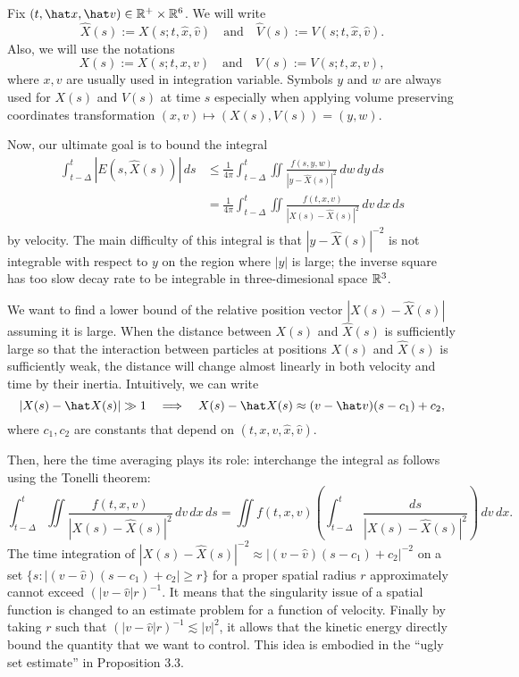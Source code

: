 \documentclass{article}
\begin{document}
\begin{notn*}
Fix $(t,\hat x,\hat v)\in\R^+\times\R^6$.
We will write
\[\hat X(s):=X(s;t,\hat x,\hat v)\quad\text{and}\quad\hat V(s):=V(s;t,\hat x,\hat v).\]
Also, we will use the notations
\[X(s):=X(s;t,x,v)\quad\text{and}\quad V(s):=V(s;t,x,v),\]
where $x,v$ are usually used in integration variable.
Symbols $y$ and $w$ are always used for $X(s)$ and $V(s)$ at time $s$ especially when applying volume preserving coordinates transformation $(x,v)\mapsto(X(s),V(s))=(y,w)$.
\end{notn*}

Now, our ultimate goal is to bound the integral
\begin{align*}
\int_{t-\Delta}^t|E(s,\hat X(s))|\,ds
&\le\frac1{4\pi}\int_{t-\Delta}^t\iint\frac{f(s,y,w)}{|y-\hat X(s)|^2}\,dw\,dy\,ds\\
&=\frac1{4\pi}\int_{t-\Delta}^t\iint\frac{f(t,x,v)}{|X(s)-\hat X(s)|^2}\,dv\,dx\,ds
\end{align*}
by velocity.
The main difficulty of this integral is that $|y-\hat X(s)|^{-2}$ is not integrable with respect to $y$ on the region where $|y|$ is large; the inverse square has too slow decay rate to be integrable in three-dimesional space $\mathbb{R}^3$.

We want to find a lower bound of the relative position vector $|X(s)-\hat X(s)|$ assuming it is large.
When the distance between $X(s)$ and $\hat X(s)$ is sufficiently large so that the interaction between particles at positions $X(s)$ and $\hat X(s)$ is sufficiently weak, the distance will change almost linearly in both velocity and time by their inertia.
Intuitively, we can write
\[|X(s)-\hat X(s)|\gg1\impl X(s)-\hat X(s)\approx (v-\hat v)(s-c_1)+c_2,\]
where $c_1,c_2$ are constants that depend on $(t,x,v,\hat x,\hat v)$.

Then, here the time averaging plays its role: interchange the integral as follows using the Tonelli theorem:
\[\int_{t-\Delta}^t\iint\frac{f(t,x,v)}{|X(s)-\hat X(s)|^2}\,dv\,dx\,ds=\iint f(t,x,v)\left(\int_{t-\Delta}^t\frac{ds}{|X(s)-\hat X(s)|^2}\right)\,dv\,dx.\]
The time integration of $|X(s)-\hat X(s)|^{-2}\approx|(v-\hat v)(s-c_1)+c_2|^{-2}$ on a set $\{s:|(v-\hat v)(s-c_1)+c_2|\ge r\}$ for a proper spatial radius $r$ approximately cannot exceed $(|v-\hat v|r)^{-1}$.
It means that the singularity issue of a spatial function is changed to an estimate problem for a function of velocity.
Finally by taking $r$ such that $(|v-\hat v|r)^{-1}\lesssim|v|^2$, it allows that the kinetic energy directly bound the quantity that we want to control.
This idea is embodied in the ``ugly set estimate'' in Proposition 3.3.
\end{document}
